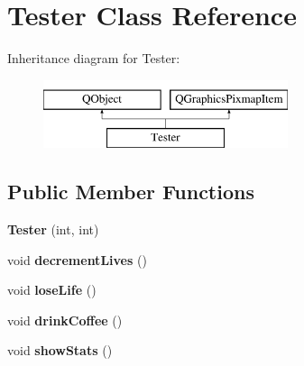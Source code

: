 \hypertarget{classTester}{\section{Tester Class Reference}
\label{classTester}
}
Inheritance diagram for Tester\-:\begin{figure}[H]
\begin{center}
\leavevmode
\includegraphics[height=2.000000cm]{classTester}
\end{center}
\end{figure}
\subsection*{Public Member Functions}
\begin{DoxyCompactItemize}
\item 
\hypertarget{classTester_afb0aa17f262b935a12fd05ad3e251164}{{\bfseries Tester} (int, int)}\label{classTester_afb0aa17f262b935a12fd05ad3e251164}

\item 
\hypertarget{classTester_a28def7e2c183306398147efbdd2c4065}{void {\bfseries decrement\-Lives} ()}\label{classTester_a28def7e2c183306398147efbdd2c4065}

\item 
\hypertarget{classTester_a1b36883ccf998c0f71f639483c9bb5ff}{void {\bfseries lose\-Life} ()}\label{classTester_a1b36883ccf998c0f71f639483c9bb5ff}

\item 
\hypertarget{classTester_aac5a0da7cac293ec43ac668f51731d96}{void {\bfseries drink\-Coffee} ()}\label{classTester_aac5a0da7cac293ec43ac668f51731d96}

\item 
\hypertarget{classTester_a6a66686d4d4c4598a327c408ba090dd9}{void {\bfseries show\-Stats} ()}\label{classTester_a6a66686d4d4c4598a327c408ba090dd9}

\end{DoxyCompactItemize}

